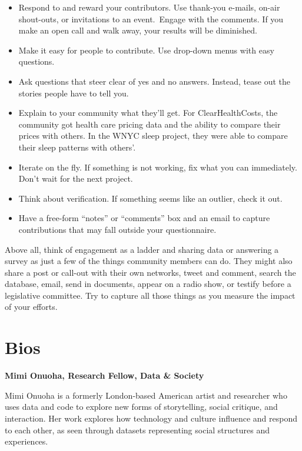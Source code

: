 \begin{itemize}
\begin{itemize}
\item Respond to and reward your contributors. Use thank-you e-mails, on-air shout-outs, or invitations to an event. Engage with the comments. If you make an open call and walk away, your results will be diminished. 

\item Make it easy for people to contribute. Use drop-down menus with easy questions. 

\item Ask questions that steer clear of yes and no answers. Instead, tease out the stories people have to tell you. 

\item Explain to your community what they’ll get. For ClearHealthCosts, the community got health care pricing data and the ability to compare their prices with others. In the WNYC sleep project, they were able to compare their sleep patterns with others’. 

\item Iterate on the fly. If something is not working, fix what you can immediately. Don’t wait for the next project. 

\item Think about verification. If something seems like an outlier, check it out. 

\item Have a free-form ``notes'' or ``comments'' box and an email to capture contributions that may fall outside your questionnaire.
\end{itemize}
Above all, think of engagement as a ladder and sharing data or answering a survey as just a few of the things community members can do. They might also share a post or call-out with their own networks, tweet and comment, search the database, email, send in documents, appear on a radio show, or testify before a legislative committee. Try to capture all those things as you measure the impact of your efforts.


\chapter{Bios}

\textbf{Mimi Onuoha, Research Fellow, Data & Society} 

Mimi Onuoha is a formerly London-based American artist and researcher who uses data and code to explore new forms of storytelling, social critique, and interaction. Her work explores how technology and culture influence and respond to each other, as seen through datasets representing social structures and experiences.


\end{itemize}
